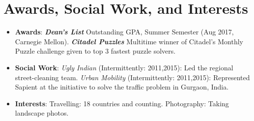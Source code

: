 \documentclass[letterpaper,10.8pt]{article}
\newcommand{\resumeItem}[2]{
  \item\small{
    \textbf{#1}{: #2 \vspace{-2pt}}
  }
}
\newcommand{\resumeItemListStart}{\begin{itemize}}
\newcommand{\resumeItemListEnd}{\end{itemize}\vspace{-5pt}}
\begin{document}
\section{Awards, Social Work, and Interests}
\resumeItemListStart
	\resumeItem{Awards}
	{\textbf{\textit{Dean's List}} Outstanding GPA, Summer Semester (Aug 2017, Carnegie Mellon). \textbf{\textit{Citadel Puzzles}} Multitime winner of Citadel's Monthly Puzzle challenge given to top 3 fastest puzzle solvers.}
	\resumeItem{Social Work}{\textit{Ugly Indian} (Intermittently: 2011,2015): Led the regional street-cleaning team. \textit{Urban Mobility} (Intermittently: 2011,2015): Represented Sapient at the initiative to solve the traffic problem in Gurgaon, India.}
	\resumeItem{Interests}{Travelling: 18 countries and counting. Photography: Taking landscape photos.}
	\resumeItemListEnd
\end{document}
